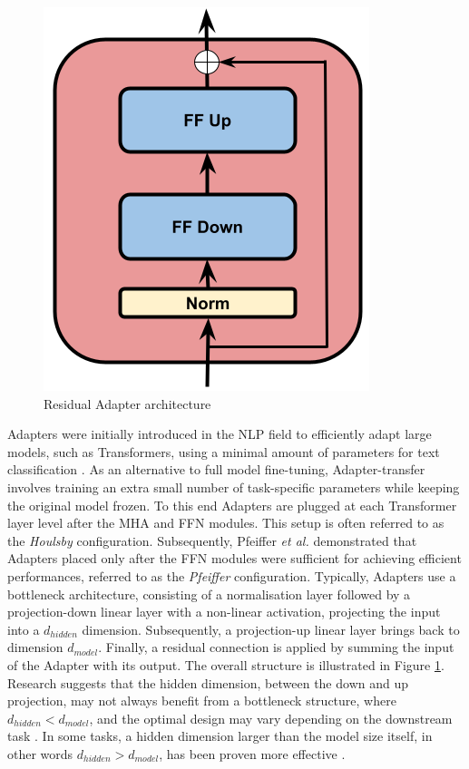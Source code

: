 \begin{figure}[t]
    \begin{center}
    \includegraphics[scale=0.3]{imgs/Adapter_alone.png}
    \caption{Residual Adapter architecture}
    \label{fig:Adapter_architecture}
    \end{center}
    \end{figure}

    
Adapters were initially introduced in the \ac{NLP} field to efficiently adapt large models, such as Transformers, using a minimal amount of parameters for text classification \cite{houlsby}. As an alternative to full model fine-tuning, Adapter-transfer involves training an extra small number of task-specific parameters while keeping the original model frozen. To this end Adapters are plugged at each Transformer layer level after the \ac{MHA} and \ac{FFN} modules. This setup is often referred to as the \textit{Houlsby} configuration. Subsequently, Pfeiffer \textit{et al.} \cite{pfeiffer} demonstrated that Adapters placed only after the \ac{FFN} modules were sufficient for achieving efficient performances, referred to as the \textit{Pfeiffer} configuration. Typically, Adapters use a bottleneck architecture, consisting of a normalisation layer followed by a projection-down linear layer with a non-linear activation, projecting the input into a $d_{hidden}$ dimension. Subsequently, a projection-up linear layer brings back to dimension $d_{model}$. Finally, a residual connection is applied by summing the input of the Adapter with its output. The overall structure is illustrated in Figure \ref{fig:Adapter_architecture}. Research suggests that the hidden dimension, between the down and up projection, may not always benefit from a bottleneck structure, where $d_{hidden} < d_{model}$, and the optimal design may vary depending on the downstream task \cite{houlsby}. In some tasks, a hidden dimension larger than the model size itself, in other words $d_{hidden} > d_{model}$, has been proven more effective \cite{fan2022draft}.

